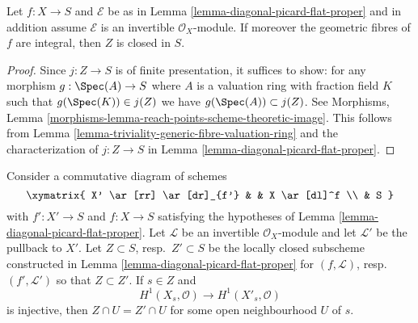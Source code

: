 \begin{lemma}
\label{lemma-get-a-closed}
Let $f : X \to S$ and $\mathcal{E}$ be as in
Lemma \ref{lemma-diagonal-picard-flat-proper}
and in addition assume $\mathcal{E}$ is an invertible $\mathcal{O}_X$-module.
If moreover the geometric fibres of $f$ are
integral, then $Z$ is closed in $S$.
\end{lemma}

\begin{proof}
Since $j : Z \to S$ is of finite presentation, it suffices
to show: for any morphism $g : \Spec(A) \to S$ where $A$ is a
valuation ring with fraction field $K$ such that $g(\Spec(K)) \in j(Z)$
we have $g(\Spec(A)) \subset j(Z)$. See
Morphisms, Lemma \ref{morphisms-lemma-reach-points-scheme-theoretic-image}.
This follows from Lemma \ref{lemma-triviality-generic-fibre-valuation-ring}
and the characterization of $j : Z \to S$ in
Lemma \ref{lemma-diagonal-picard-flat-proper}.
\end{proof}

\begin{lemma}
\label{lemma-H1-O-picard-flat-proper}
Consider a commutative diagram of schemes
$$
\xymatrix{
X' \ar[rr] \ar[dr]_{f'} & & X \ar[dl]^f \\
& S
}
$$
with $f' : X' \to S$ and $f : X \to S$ satisfying the hypotheses of
Lemma \ref{lemma-diagonal-picard-flat-proper}.
Let $\mathcal{L}$ be an invertible $\mathcal{O}_X$-module
and let $\mathcal{L}'$ be the pullback to $X'$. Let $Z \subset S$,
resp.\ $Z' \subset S$ be the locally closed subscheme constructed
in Lemma \ref{lemma-diagonal-picard-flat-proper}
for $(f, \mathcal{L})$, resp.\ $(f', \mathcal{L}')$
so that $Z \subset Z'$. If $s \in Z$ and
$$
H^1(X_s, \mathcal{O}) \longrightarrow H^1(X'_s, \mathcal{O})
$$
is injective, then $Z \cap U = Z' \cap U$ for some open neighbourhood
$U$ of $s$.
\end{lemma}


